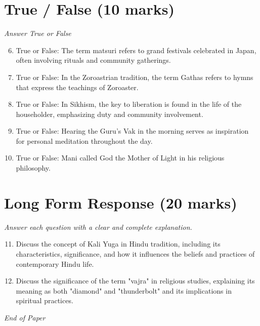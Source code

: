 \documentclass[12pt]{article}
\begin{document}
\section*{True / False (10 marks)}
\textit{Answer True or False}
\begin{enumerate}[label=\arabic*.]
\setcounter{enumi}{5}
\item True or False: The term matsuri refers to grand festivals celebrated in Japan, often involving rituals and community gatherings.
\item True or False: In the Zoroastrian tradition, the term Gathas refers to hymns that express the teachings of Zoroaster.
\item True or False: In Sikhism, the key to liberation is found in the life of the householder, emphasizing duty and community involvement.
\item True or False: Hearing the Guru's Vak in the morning serves as inspiration for personal meditation throughout the day.
\item True or False: Mani called God the Mother of Light in his religious philosophy.
\end{enumerate}

\section*{Long Form Response (20 marks)}
\textit{Answer each question with a clear and complete explanation.}
\begin{enumerate}[label=\arabic*.]
\setcounter{enumi}{10}
\item Discuss the concept of Kali Yuga in Hindu tradition, including its characteristics, significance, and how it influences the beliefs and practices of contemporary Hindu life.
\item Discuss the significance of the term "vajra" in religious studies, explaining its meaning as both "diamond" and "thunderbolt" and its implications in spiritual practices.
\end{enumerate}

\vfill
\noindent\textit{End of Paper}
\end{document}
